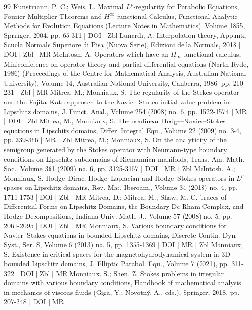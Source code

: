 \documentclass[10pt]{amsart}
\theoremstyle{definition}\newtheorem{defi}[theo]{Definition}\newtheorem{rema}[theo]{Remark}\newtheorem{exam}[theo]{Example}\newtheorem{exem}[theo]{Example}\newtheorem{nota}[theo]{Notation}
\begin{document}
\begin{thebibliography}{99}
 Kunstmann, P. C.; Weis, L. Maximal ${L}^p$-regularity for Parabolic Equations, Fourier Multiplier Theorems and ${H}^{\infty }$-functional Calculus, Functional Analytic Methods for Evolution Equations (Lecture Notes in Mathematics), Volume 1855, Springer, 2004, pp. 65-311 | DOI | Zbl
 Lunardi, A. Interpolation theory, Appunti. Scuola Normale Superiore di Pisa (Nuova Serie), Edizioni della Normale, 2018 | DOI | Zbl | MR
 McIntosh, A. Operators which have an ${H}_\infty $ functional calculus, Miniconference on operator theory and partial differential equations (North Ryde, 1986) (Proceedings of the Centre for Mathematical Analysis, Australian National University), Volume 14, Australian National University, Canberra, 1986, pp. 210-231 | Zbl | MR
 Mitrea, M.; Monniaux, S. The regularity of the Stokes operator and the Fujita–Kato approach to the Navier–Stokes initial value problem in Lipschitz domains, J. Funct. Anal., Volume 254 (2008) no. 6, pp. 1522-1574 | MR | DOI | Zbl
 Mitrea, M.; Monniaux, S. The nonlinear Hodge–Navier–Stokes equations in Lipschitz domains, Differ. Integral Equ., Volume 22 (2009) no. 3-4, pp. 339-356 | MR | Zbl
 Mitrea, M.; Monniaux, S. On the analyticity of the semigroup generated by the Stokes operator with Neumann-type boundary conditions on Lipschitz subdomains of Riemannian manifolds, Trans. Am. Math. Soc., Volume 361 (2009) no. 6, pp. 3125-3157 | DOI | MR | Zbl
 McIntosh, A.; Monniaux, S. Hodge–Dirac, Hodge–Laplacian and Hodge–Stokes operators in ${L}^p$ spaces on Lipschitz domains, Rev. Mat. Iberoam., Volume 34 (2018) no. 4, pp. 1711-1753 | DOI | Zbl | MR
 Mitrea, D.; Mitrea, M.; Shaw, M.-C. Traces of Differential Forms on Lipschitz Domains, the Boundary De Rham Complex, and Hodge Decompositions, Indiana Univ. Math. J., Volume 57 (2008) no. 5, pp. 2061-2095 | DOI | Zbl | MR
 Monniaux, S. Various boundary conditions for Navier–Stokes equations in bounded Lipschitz domains, Discrete Contin. Dyn. Syst., Ser. S, Volume 6 (2013) no. 5, pp. 1355-1369 | DOI | MR | Zbl
 Monniaux, S. Existence in critical spaces for the magnetohydrodynamical system in 3D bounded Lipschitz domains, J. Elliptic Parabol. Equ., Volume 7 (2021), pp. 311-322 | DOI | Zbl | MR
 Monniaux, S.; Shen, Z. Stokes problems in irregular domains with various boundary conditions, Handbook of mathematical analysis in mechanics of viscous fluids (Giga, Y.; Novotný, A., eds.), Springer, 2018, pp. 207-248 | DOI | MR

\end{thebibliography}
\end{document}
